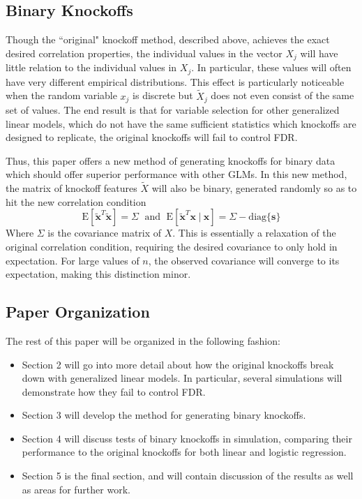 \documentclass[11pt]{article}
\newcommand{\E}{\mathrm{E}}
\newcommand{\diag}[1]{\mathrm{diag}\{#1\}}
\newcommand{\st}{ \; \big | \:}
\theoremstyle{definition}
\begin{document}
\subsection{Binary Knockoffs}
    Though the ``original" knockoff method, described above, achieves the exact desired correlation properties, the individual values in the vector $X_j$ will have little relation to the individual values in $X_j$. In particular, these values will often have very different empirical distributions. This effect is particularly noticeable when the random variable $x_j$ is discrete but $\tilde X_j$ does not even consist of the same set of values. The end result is that for variable selection for other generalized linear models, which do not have the same sufficient statistics which knockoffs are designed to replicate, the original knockoffs will fail to control FDR. \par
    Thus, this paper offers a new method of generating knockoffs for binary data which should offer superior performance with other GLMs. In this new method, the matrix of knockoff features $\tilde X$ will also be binary, generated randomly so as to hit the new correlation condition
    \[ \E[\mathbf{\tilde x}^T\mathbf{\tilde x}]=\Sigma \; \textrm{ and } \; \E[\mathbf{\tilde x}^T \mathbf x \st \mathbf x] = \Sigma - \diag{\mathbf s}\]
    Where $\Sigma$ is the covariance matrix of $X$. This is essentially a relaxation of the original correlation condition, requiring the desired covariance to only hold in expectation. For large values of $n$, the observed covariance will converge to its expectation, making this distinction minor.

\subsection{Paper Organization}
The rest of this paper will be organized in the following fashion:
\begin{itemize}
    \item Section 2 will go into more detail about how the original knockoffs break down with generalized linear models. In particular, several simulations will demonstrate how they fail to control FDR.
    \item Section 3 will develop the method for generating binary knockoffs.
    \item Section 4 will discuss tests of binary knockoffs in simulation, comparing their performance to the original knockoffs for both linear and logistic regression. 
    \item Section 5 is the final section, and will contain discussion of the results as well as areas for further work.
\end{itemize}
\end{document}
